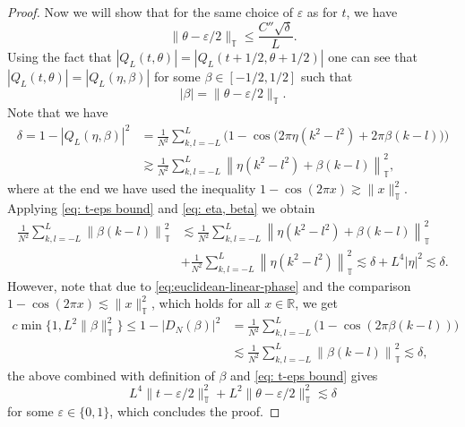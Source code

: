\documentclass{article}
\newcommand{\T}{\mathbb T}
\theoremstyle{plain}
\numberwithin{equation}{section}
\begin{document}
\begin{proof}
Now we will show that for the same choice of $\varepsilon$ as for $t$, we have 
\begin{equation*} 
    \| \theta -\varepsilon/2 \|_{\T} \le \frac{C'' \sqrt{\delta}}{L}.
\end{equation*}
Using the fact that $|Q_{L}(t,\theta)|=|Q_{L}(t+ 1/2,\theta+1/2)|$ one can see that 
$|Q_L(t, \theta)|=|Q_L(\eta, \beta)|$ for some $\beta \in [-1/2, 1/2]$ such that 
\begin{equation*}
    |\beta|= \|\theta -\varepsilon/2 \|_{\T}.
\end{equation*}
Note that we have 
\begin{equation}
\label{eq: eta, beta}
\begin{split}
    \delta=1-|Q_L(\eta,\beta)|^2&=\frac{1}{N^2} \sum_{k,l=-L}^{L}\Big(1-\cos\big(2\pi\eta(k^2-l^2)+2\pi\beta(k-l)\big) \Big) \\
    &\gtrsim \frac{1}{N^2} \sum_{k,l=-L}^{L} \left\| \eta(k^2-l^2)+\beta(k-l)\right \|_{\T}^2, 
\end{split}
\end{equation}
where at the end we have used the inequality $1- \cos(2\pi x) \gtrsim  \|x \|_{\T}^2$. Applying \eqref{eq: t-eps bound} and \eqref{eq: eta, beta} we obtain 
\begin{align*}
    \frac{1}{N^2} \sum_{k,l=-L}^{L} \left\| \beta(k-l)\right \|_{\T}^2 &\lesssim \frac{1}{N^2} \sum_{k,l=-L}^{L} \left\| \eta(k^2-l^2)+\beta(k-l)\right \|_{\T}^2 \\
    &+  \frac{1}{N^2} \sum_{k,l=-L}^{L}\left\| \eta(k^2-l^2) \right \|_{\T}^2 \lesssim \delta + L^4 |\eta|^2 \lesssim \delta.
\end{align*}
However, note that due to \eqref{eq:euclidean-linear-phase} and the comparison $1- \cos(2 \pi x) \lesssim \|x \|_{\T}^2$, which holds for all $x \in \mathbb R$, we get
\begin{align*}
    c\min\{1, L^2\|\beta \|_{\T}^2 \} \le1-|D_N(\beta)|^2&=  \frac{1}{N^2} \sum_{k,l=-L}^{L} \big(1-\cos\left(2\pi\beta(k-l) \right) \big)   \\ &\lesssim\frac{1}{N^2} \sum_{k,l=-L}^{L} \left\| \beta(k-l)\right \|_{\T}^2 \lesssim \delta,
\end{align*}
the above combined with definition of $\beta$ and \eqref{eq: t-eps bound} gives 
\begin{equation*}
    L^4\|t - \varepsilon/2 \|_{\T}^2+ L^2 \| \theta - \varepsilon/2 \|_{\T}^2 \lesssim \delta
\end{equation*}
for some $\varepsilon \in \{0,1\}$, which concludes the proof.
\end{proof}
\end{document}
